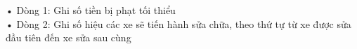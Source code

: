 • Dòng 1: Ghi số tiền bị phạt tối thiểu
\\• Dòng 2: Ghi số hiệu các xe sẽ tiến hành sửa chữa, theo thứ tự từ xe được sửa đầu tiên đến xe sửa sau cùng

\